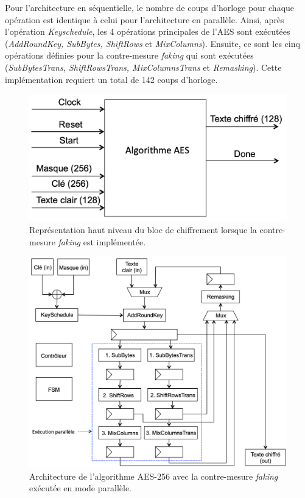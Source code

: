 \documentclass[oneside]{book}
\begin{document}
Pour l'architecture en séquentielle, le nombre de coups d'horloge pour chaque opération est identique à celui pour l'architecture en parallèle. Ainsi, après l'opération \textit{Keyschedule}, les 4 opérations principales de l'AES sont exécutées (\textit{AddRoundKey, SubBytes, ShiftRows} et \textit{MixColumns}). Ensuite, ce sont les cinq opérations définies pour la contre-mesure \textit{faking} qui sont exécutées (\textit{SubBytesTrans, ShiftRowsTrans, MixColumnsTrans} et \textit{Remasking}). Cette implémentation requiert un total de 142 coups d'horloge.

\begin{figure}[htbp]
    \centering
    \includegraphics[scale=0.5]{image/FPGA_AES_Faking_top}
    \caption{Représentation haut niveau du bloc de chiffrement lorsque la contre-mesure \textit{faking} est implémentée.}
    \label{fig:FPGA_AES_Faking_top} 
\end{figure}

\begin{figure}[htbp]
    \hspace{-0.5cm}
    \includegraphics[scale=0.78]{image/FPGA_arch_faking_parallele}
    \caption{Architecture de l’algorithme AES-256 avec la contre-mesure \textit{faking} exécutée en mode parallèle.}
    \label{fig:FPGA_arch_faking_parallele} 
\end{figure}
\end{document}
